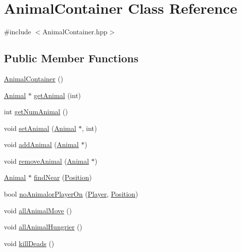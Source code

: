 \hypertarget{class_animal_container}{}\section{Animal\+Container Class Reference}
\label{class_animal_container}


{\ttfamily \#include $<$Animal\+Container.\+hpp$>$}

\subsection*{Public Member Functions}
\begin{DoxyCompactItemize}
\item 
\mbox{\hyperlink{class_animal_container_a420f7da157311e3ec55f2b963baf83bc}{Animal\+Container}} ()
\item 
\mbox{\hyperlink{class_animal}{Animal}} $\ast$ \mbox{\hyperlink{class_animal_container_a6bba409e3e4b31e65134b1efd6910a3e}{get\+Animal}} (int)
\item 
int \mbox{\hyperlink{class_animal_container_a833f30ae3d1f5d065204b2ad75e89e95}{get\+Num\+Animal}} ()
\item 
void \mbox{\hyperlink{class_animal_container_ac957de33fff063b3506c62c5b68eb541}{set\+Animal}} (\mbox{\hyperlink{class_animal}{Animal}} $\ast$, int)
\item 
void \mbox{\hyperlink{class_animal_container_a39a176984bf7625f6366c824cb6d79de}{add\+Animal}} (\mbox{\hyperlink{class_animal}{Animal}} $\ast$)
\item 
void \mbox{\hyperlink{class_animal_container_a606e8fbe513b23a09e58b4e6484795de}{remove\+Animal}} (\mbox{\hyperlink{class_animal}{Animal}} $\ast$)
\item 
\mbox{\hyperlink{class_animal}{Animal}} $\ast$ \mbox{\hyperlink{class_animal_container_aac13ed7fa4e1ce07e98d1152012d50b2}{find\+Near}} (\mbox{\hyperlink{class_position}{Position}})
\item 
bool \mbox{\hyperlink{class_animal_container_abbda31303f225ff20f472f894444f1cc}{no\+Animalor\+Player\+On}} (\mbox{\hyperlink{class_player}{Player}}, \mbox{\hyperlink{class_position}{Position}})
\item 
void \mbox{\hyperlink{class_animal_container_a1df23ab6e16f8be97df230b5b632af6c}{all\+Animal\+Move}} ()
\item 
void \mbox{\hyperlink{class_animal_container_afef91ad4df3c18b9fc6c2995783887dd}{all\+Animal\+Hungrier}} ()
\item 
void \mbox{\hyperlink{class_animal_container_a9c877733c04093a8017ff7b088a9b79a}{kill\+Deads}} ()
\end{DoxyCompactItemize}



